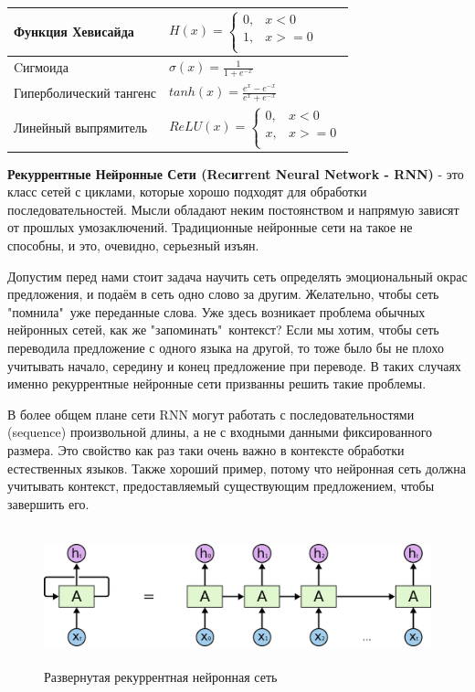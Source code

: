 \documentclass[a4paper,russian]{article}
\begin{document}
	\begin{table}[h]
		\centering
		\begin{tabular}{|l|l|} 
			\hline
			Функция Хевисайда       &   
			$ H(x) = 
			\begin{cases}
				0, & x < 0 \\
				1, & x >= 0 \\
			\end{cases}$ \\ 
			\hline
			Cигмоида                &  $\sigma(x) = \frac{1}{1 + e^{-x}}$ \\ 
			\hline
			Гиперболический тангенс &  $tanh(x) = \frac{e^x - e^{-x}}{e^x + e^{-x}}$ \\ 
			\hline
			Линейный выпрямитель    &  
			$ReLU(x) =  
			\begin{cases}
				0, & x < 0 \\
				x, & x >= 0 \\
			\end{cases}$ \\
			\hline
		\end{tabular}
	\end{table}

	\clearpage
	
	\textbf{Рекуррентные Нейронные Сети (Recиrrent Neural Network - RNN)} - это класс сетей с циклами, которые хорошо подходят для обработки последовательностей. Мысли обладают неким постоянством и напрямую зависят от прошлых умозаключений. Традиционные нейронные сети на такое не способны, и это, очевидно, серьезный изъян. 
	
	Допустим перед нами стоит задача научить сеть определять эмоциональный окрас предложения, и подаём в сеть одно слово за другим. Желательно, чтобы сеть "помнила"\ уже переданные слова. Уже здесь возникает проблема обычных нейронных сетей, как же "запоминать"\ контекст? Если мы хотим, чтобы сеть переводила предложение с одного языка на другой, то тоже было бы не плохо учитывать начало, середину и конец предложение при переводе. В таких случаях именно рекуррентные нейронные сети призванны решить такие проблемы.

	В более общем плане сети RNN могут работать с последовательностями (sequence) произвольной длины, а не с входными данными фиксированного размера. Это свойство как раз таки очень важно в контексте обработки естественных языков. Также хороший пример, потому что нейронная сеть должна учитывать контекст, предоставляемый существующим предложением, чтобы завершить его.

	\begin{figure}[ht!]
		\centering
		\captionsetup{justification=centering}
		\includegraphics[height=40mm]{img/3.png}
		\caption{Развернутая рекуррентная нейронная сеть}
	\end{figure}
	
\end{document}
